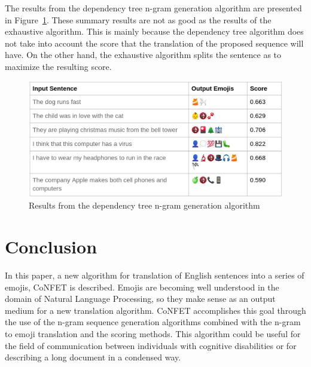 \documentclass{article}[10]
\begin{document}
The results from the dependency tree n-gram generation algorithm are
presented in Figure~\ref{fig:dependency}. These summary
results are not as good as the results of the exhaustive algorithm.
This is mainly because the dependency tree algorithm does not take
into account the score that the translation of the proposed sequence
will have. On the other hand, the exhaustive algorithm splits the
sentence as to maximize the resulting score.
\begin{figure}[H]
  \begin{center}
    \includegraphics[width=0.70\columnwidth]{figures/dependency.png}
      \caption{Results from the dependency tree n-gram generation algorithm\label{fig:dependency}}
  \end{center}
\end{figure}

\section{Conclusion}

In this paper, a new algorithm for translation of English sentences
into a series of emojis, CoNFET is described. Emojis are becoming well
understood in the domain of Natural Language Processing, so they make
sense as an output medium for a new translation algorithm. CoNFET
accomplishes this goal through the use of the n-gram sequence generation
algorithms combined with the n-gram to emoji translation and the scoring
methods. This algorithm could be useful for the field of communication
between individuals with cognitive disabilities or for describing a long
document in a condensed way.
\end{document}
